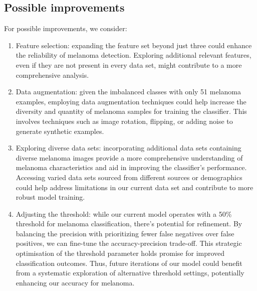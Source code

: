 \subsection{Possible improvements}
For possible improvements, we consider:
\begin{enumerate}
    \item Feature selection: expanding the feature set beyond just three could enhance the reliability of melanoma detection. Exploring additional relevant features, even if they are not present in every data set, might contribute to a more comprehensive analysis.\

    \item Data augmentation: given the imbalanced classes with only 51 melanoma examples, employing data augmentation techniques could help increase the diversity and quantity of melanoma samples for training the classifier. This involves techniques such as image rotation, flipping, or adding noise to generate synthetic examples.\

    \item Exploring diverse data sets: incorporating additional data sets containing diverse melanoma images provide a more comprehensive understanding of melanoma characteristics and aid in improving the classifier's performance. Accessing varied data sets sourced from different sources or demographics could help address limitations in our current data set and contribute to more robust model training.\

    \item Adjusting the threshold: while our current model operates with a 50\% threshold for melanoma classification, there's potential for refinement. By balancing the precision with prioritizing fewer false negatives over false positives, we can fine-tune the accuracy-precision trade-off. This strategic optimisation of the threshold parameter holds promise for improved classification outcomes. Thus, future iterations of our model could benefit from a systematic exploration of alternative threshold settings, potentially enhancing our accuracy for melanoma.
    
\end{enumerate}